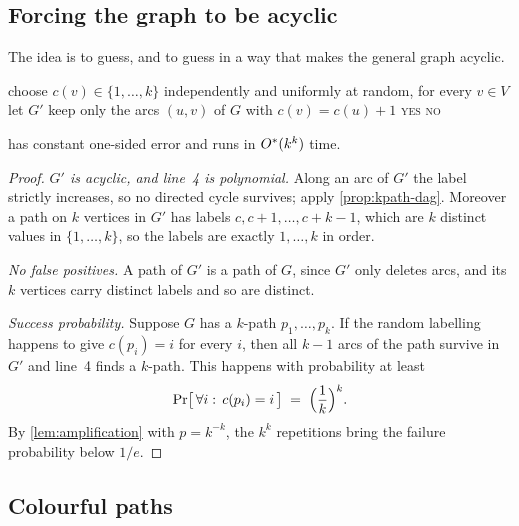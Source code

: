 \subsection{Forcing the graph to be acyclic}

The idea is to guess, and to guess in a way that makes the general graph
acyclic.

\begin{algorithm}[ht]
\caption{Colour coding for , first version}
\label{alg:colour-coding-1}
\begin{algorithmic}[1]
    \State choose $c(v) \in \{1,\ldots,k\}$ independently and uniformly at
           random, for every $v \in V$
    \State let $G'$ keep only the arcs $(u,v)$ of $G$ with $c(v) = c(u) + 1$
     \Return \textsc{yes} \EndIf
  \EndFor
  \State \Return \textsc{no}
\end{algorithmic}
\end{algorithm}

\begin{theorem}\label{thm:colour-coding-1}
 has constant one-sided error and runs in
$O^{*}(k^k)$ time.
\end{theorem}

\begin{proof}
\emph{$G'$ is acyclic, and line~4 is polynomial.} Along an arc of $G'$ the
label strictly increases, so no directed cycle survives; apply
\cref{prop:kpath-dag}. Moreover a path on $k$ vertices in $G'$ has labels
$c, c+1, \ldots, c+k-1$, which are $k$ distinct values in $\{1,\ldots,k\}$, so
the labels are exactly $1,\ldots,k$ in order.

\emph{No false positives.} A path of $G'$ is a path of $G$, since $G'$ only
deletes arcs, and its $k$ vertices carry distinct labels and so are distinct.

\emph{Success probability.} Suppose $G$ has a $k$-path $p_1, \ldots, p_k$. If
the random labelling happens to give $c(p_i) = i$ for every $i$, then all $k-1$
arcs of the path survive in $G'$ and line~4 finds a $k$-path. This happens with
probability at least
\[ \Pr\bigl[\, \forall i:\, c(p_i) = i \,\bigr] \;=\;
   \Bigl(\frac1k\Bigr)^{k}. \]
By \cref{lem:amplification} with $p = k^{-k}$, the $k^k$ repetitions bring the
failure probability below $1/e$.
\end{proof}

\subsection{Colourful paths}

